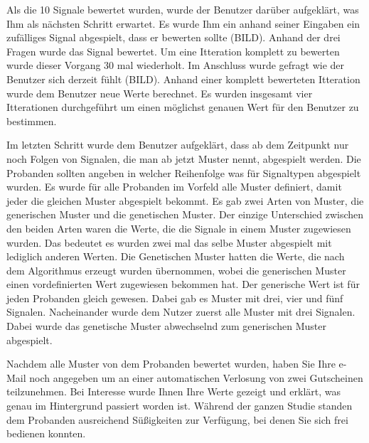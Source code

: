 Als die 10 Signale bewertet wurden, wurde der Benutzer dar{\"u}ber aufgekl{\"a}rt, was Ihm als n{\"a}chsten Schritt erwartet. Es wurde Ihm ein anhand seiner Eingaben ein zuf{\"a}lliges Signal abgespielt, dass er bewerten sollte (BILD). Anhand der drei Fragen wurde das Signal bewertet. Um eine Itteration komplett zu bewerten wurde dieser Vorgang 30 mal wiederholt. Im Anschluss wurde gefragt wie der Benutzer sich derzeit f{\"u}hlt (BILD). Anhand einer komplett bewerteten Itteration wurde dem Benutzer neue Werte berechnet. Es wurden insgesamt vier Itterationen durchgef{\"u}hrt um einen m{\"o}glichst genauen Wert f{\"u}r den Benutzer zu bestimmen.

Im letzten Schritt wurde dem Benutzer aufgekl{\"a}rt, dass ab dem Zeitpunkt nur noch Folgen von Signalen, die man ab jetzt Muster nennt, abgespielt werden. Die Probanden sollten angeben in welcher Reihenfolge was f{\"u}r Signaltypen abgespielt wurden. Es wurde f{\"u}r alle Probanden im Vorfeld alle Muster definiert, damit jeder die gleichen Muster abgespielt bekommt. Es gab zwei Arten von Muster, die generischen Muster und die genetischen Muster. Der einzige Unterschied zwischen den beiden Arten waren die Werte, die die Signale in einem Muster zugewiesen wurden. Das bedeutet es wurden zwei mal das selbe Muster abgespielt mit lediglich anderen Werten. Die Genetischen Muster hatten die Werte, die nach dem Algorithmus erzeugt wurden {\"u}bernommen, wobei die generischen Muster einen vordefinierten Wert zugewiesen bekommen hat. Der generische Wert ist f{\"u}r jeden Probanden gleich gewesen.
Dabei gab es Muster mit drei, vier und f{\"u}nf Signalen. Nacheinander wurde dem Nutzer zuerst alle Muster mit drei Signalen. Dabei wurde das genetische Muster abwechselnd zum generischen Muster abgespielt. 

Nachdem alle Muster von dem Probanden bewertet wurden, haben Sie Ihre e-Mail noch angegeben um an einer automatischen Verlosung von zwei Gutscheinen teilzunehmen. Bei Interesse wurde Ihnen Ihre Werte gezeigt und erkl{\"a}rt, was genau im Hintergrund passiert worden ist. W{\"a}hrend der ganzen Studie standen dem Probanden ausreichend S{\"u}{\ss}igkeiten zur Verf{\"u}gung, bei denen Sie sich frei bedienen konnten.

